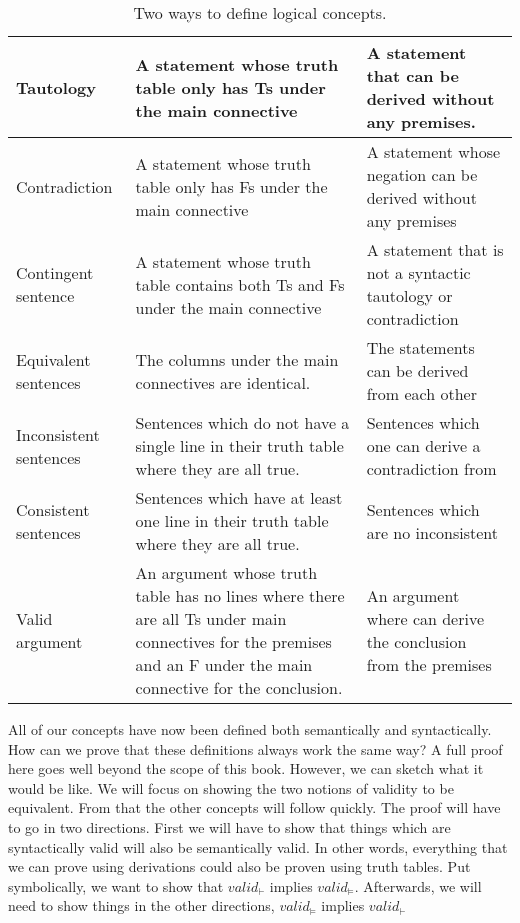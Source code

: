 {\begin{sidewaystable}
\begin{mdframed}[style=mytablebox]
\begin{tabu}{X[.5,c,m] ||X[1,l,m] |X[1,l,m]}
Tautology  &	A statement whose truth table only has Ts under the main connective & A statement that can be derived without any premises.	 \\ \hline
 
Contradiction		&	A statement whose truth table only has Fs under the main connective  &	A statement whose negation can be derived without any premises\\ \hline

Contingent sentence	&	A statement whose truth table contains both Ts and Fs under the main connective & A statement that is not a syntactic tautology or contradiction \\ \hline

Equivalent sentences &	The columns under the main connectives are identical.& The statements can be derived from each other	\\ \hline

Inconsistent sentences	&	Sentences which do not have a single line in their truth table where they are all true.	& Sentences which one can derive a contradiction from \\ \hline

Consistent sentences	&	Sentences which have at least one line in their truth table where they are all true. & Sentences which are no inconsistent	\\ \hline

Valid argument		&	An argument whose truth table has no lines where there are all Ts under main connectives for the premises and an F under the main connective for the conclusion.  & An argument where can derive the conclusion from the premises	\\ 
\end{tabu}
\end{mdframed}
\caption{Two ways to define logical concepts.}
\label{table:truth_tables_or_derivations}
\end{sidewaystable}

All of our concepts have now been defined both semantically and syntactically. How can we prove that these definitions always work the same way? A full proof here goes well beyond the scope of this book. However, we can sketch what it would be like. We will focus on showing the two notions of validity to be equivalent.  From that the other concepts will follow quickly. The proof will have to go in two directions. First we will have to show that things which are syntactically valid will also be semantically valid. In other words, everything that we can prove using derivations could also be proven using truth tables. Put symbolically, we want to show that $valid_{\vdash}$ implies $valid_{\models}$. Afterwards, we will need to show things in the other directions,  $valid_{\models}$ implies $valid_{\vdash}$

}
